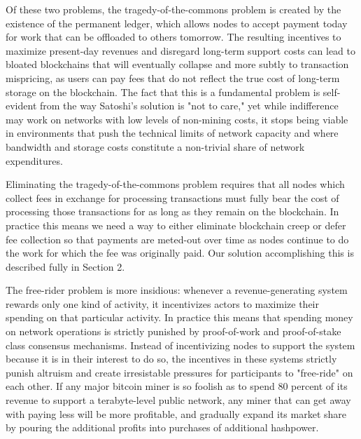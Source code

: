\documentclass[11.5pt, oneside]{article}   	%
\begin{document}
\begin{multicols}{2}
Of these two problems, the tragedy-of-the-commons problem is created by the existence of the permanent ledger, which allows nodes to accept payment today for work that can be offloaded to others tomorrow. The resulting incentives to maximize present-day revenues and disregard long-term support costs can lead to bloated blockchains that will eventually collapse and more subtly to transaction mispricing, as users can pay fees that do not reflect the true cost of long-term storage on the blockchain. The fact that this is a fundamental problem is self-evident from the way Satoshi's solution is "not to care," yet while indifference may work on networks with low levels of non-mining costs, it stops being viable in environments that push the technical limits of network capacity and where bandwidth and storage costs constitute a non-trivial share of network expenditures.

Eliminating the tragedy-of-the-commons problem requires that all nodes which collect fees in exchange for processing transactions must fully bear the cost of processing those transactions for as long as they remain on the blockchain. In practice this means we need a way to either eliminate blockchain creep or defer fee collection so that payments are meted-out over time as nodes continue to do the work for which the fee was originally paid. Our solution accomplishing this is described fully in Section 2.

The free-rider problem is more insidious: whenever a revenue-generating system rewards only one kind of activity, it incentivizes actors to maximize their spending on that particular activity. In practice this means that spending money on network operations is strictly punished by proof-of-work and proof-of-stake class consensus mechanisms. Instead of incentivizing nodes to support the system because it is in their interest to do so, the incentives in these systems strictly punish altruism and create irresistable pressures for participants to "free-ride" on each other. If any major bitcoin miner is so foolish as to spend 80 percent of its revenue to support a terabyte-level public network, any miner that can get away with paying less will be more profitable, and gradually expand its market share by pouring the additional profits into purchases of additional hashpower.


\end{multicols}
\end{document}
